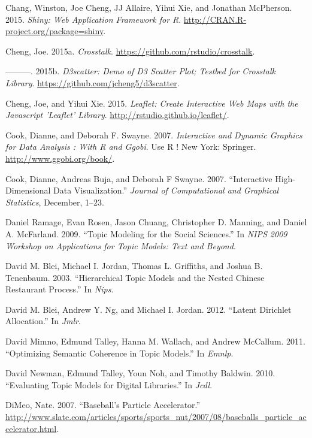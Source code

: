 \documentclass[12pt,]{isuthesis}
\begin{document}
\hypertarget{ref-shiny}{}
Chang, Winston, Joe Cheng, JJ Allaire, Yihui Xie, and Jonathan
McPherson. 2015. \emph{Shiny: Web Application Framework for R}.
\url{http://CRAN.R-project.org/package=shiny}.

\hypertarget{ref-crosstalk}{}
Cheng, Joe. 2015a. \emph{Crosstalk}.
\url{https://github.com/rstudio/crosstalk}.

\hypertarget{ref-d3scatter}{}
---------. 2015b. \emph{D3scatter: Demo of D3 Scatter Plot; Testbed for
Crosstalk Library}. \url{https://github.com/jcheng5/d3scatter}.

\hypertarget{ref-leaflet}{}
Cheng, Joe, and Yihui Xie. 2015. \emph{Leaflet: Create Interactive Web
Maps with the Javascript 'Leaflet' Library}.
\url{http://rstudio.github.io/leaflet/}.

\hypertarget{ref-ggobi:2007}{}
Cook, Dianne, and Deborah F. Swayne. 2007. \emph{Interactive and Dynamic
Graphics for Data Analysis : With R and Ggobi}. Use R ! New York:
Springer. \url{http://www.ggobi.org/book/}.

\hypertarget{ref-Cook:2007uk}{}
Cook, Dianne, Andreas Buja, and Deborah F Swayne. 2007. ``Interactive
High-Dimensional Data Visualization.'' \emph{Journal of Computational
and Graphical Statistics}, December, 1--23.

\hypertarget{ref-Ramage}{}
Daniel Ramage, Evan Rosen, Jason Chuang, Christopher D. Manning, and
Daniel A. McFarland. 2009. ``Topic Modeling for the Social Sciences.''
In \emph{NIPS 2009 Workshop on Applications for Topic Models: Text and
Beyond}.

\hypertarget{ref-Blei-hierarchical}{}
David M. Blei, Michael I. Jordan, Thomas L. Griffiths, and Joshua B.
Tenenbaum. 2003. ``Hierarchical Topic Models and the Nested Chinese
Restaurant Process.'' In \emph{Nips}.

\hypertarget{ref-Blei-2003}{}
David M. Blei, Andrew Y. Ng, and Michael I. Jordan. 2012. ``Latent
Dirichlet Allocation.'' In \emph{Jmlr}.

\hypertarget{ref-Mimno}{}
David Mimno, Edmund Talley, Hanna M. Wallach, and Andrew McCallum. 2011.
``Optimizing Semantic Coherence in Topic Models.'' In \emph{Emnlp}.

\hypertarget{ref-Newman-JCDL}{}
David Newman, Edmund Talley, Youn Noh, and Timothy Baldwin. 2010.
``Evaluating Topic Models for Digital Libraries.'' In \emph{Jcdl}.

\hypertarget{ref-slate}{}
DiMeo, Nate. 2007. ``Baseball's Particle Accelerator.''
\url{http://www.slate.com/articles/sports/sports_nut/2007/08/baseballs_particle_accelerator.html}.
\end{document}
